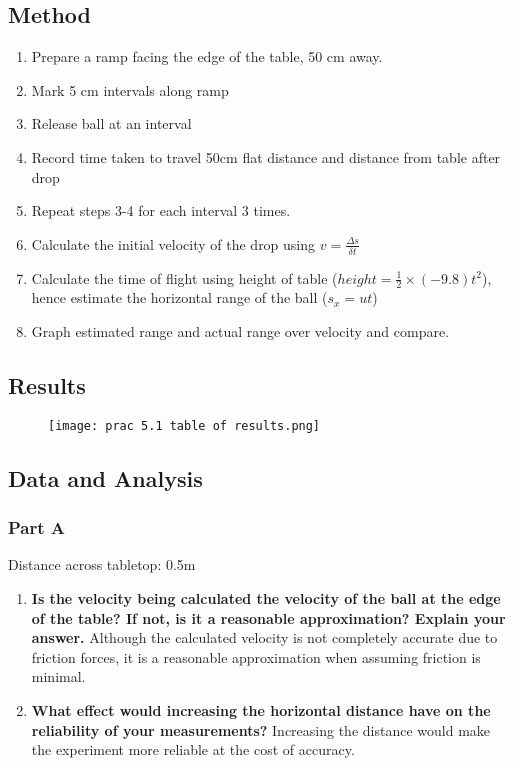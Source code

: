 	\subsection{Method}
		\begin{enumerate}
			\item Prepare a ramp facing the edge of the table, 50 cm away.
			\item Mark 5 cm intervals along ramp
			\item Release ball at an interval
			\item Record time taken to travel 50cm flat distance and distance from table after drop
			\item Repeat steps 3-4 for each interval 3 times.
			\item Calculate the initial velocity of the drop using $v = \frac{\Delta s}{\delta t}$
			\item Calculate the time of flight using height of table ($height=\frac{1}{2}\times (-9.8)t^2$), hence estimate the horizontal range of the ball ($s_{x} = ut$)
			\item Graph estimated range and actual range over velocity and compare.
		\end{enumerate}

	\subsection{Results}
		\begin{figure}[H]
			\centering
			\texttt{[image: prac 5.1 table of results.png]}
		\end{figure}

	\subsection{Data and Analysis}
		\subsubsection{Part A}
			Distance across tabletop: 0.5m
			\begin{enumerate}
				\item \textbf{Is the velocity being calculated the velocity of the ball at the edge of the table? If not, is it a reasonable approximation? Explain your answer.}
					\subitem Although the calculated velocity is not completely accurate due to friction forces, it is a reasonable approximation when assuming friction is minimal.
				\item \textbf{What effect would increasing the horizontal distance have on the reliability of your measurements?}
					\subitem Increasing the distance would make the experiment more reliable at the cost of accuracy.
			\end{enumerate}

